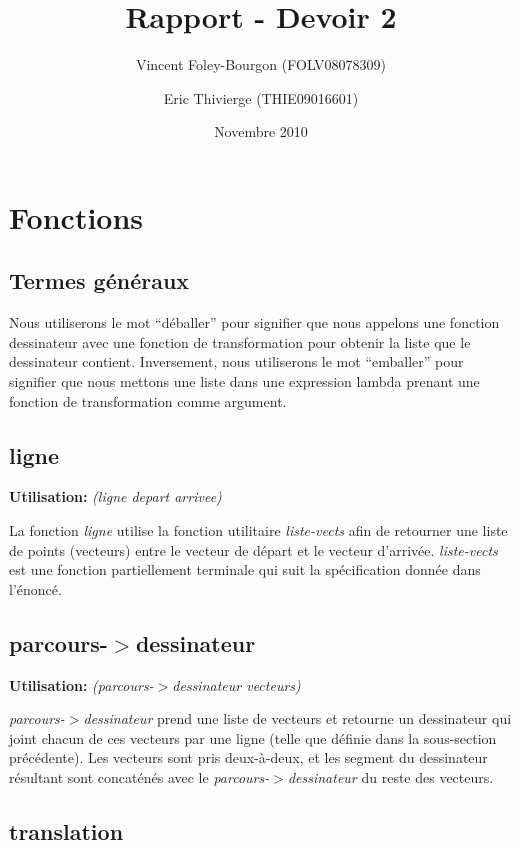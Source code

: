 \documentclass[10pt]{report}
\newcommand{\usage}[1]{\textbf{Utilisation: }\emph{#1}}
\begin{document}
\title{Rapport - Devoir 2}
\date{Novembre 2010}
\author{Vincent Foley-Bourgon (FOLV08078309) \and
  Eric Thivierge (THIE09016601)}

\maketitle

\section{Fonctions}

\subsection{Termes généraux}

Nous utiliserons le mot ``déballer'' pour signifier que nous appelons
une fonction dessinateur avec une fonction de transformation pour
obtenir la liste que le dessinateur contient.  Inversement, nous
utiliserons le mot ``emballer'' pour signifier que nous mettons une
liste dans une expression lambda prenant une fonction de
transformation comme argument.


\subsection{ligne}

\usage{(ligne depart arrivee)}

La fonction \emph{ligne} utilise la fonction utilitaire
\emph{liste-vects} afin de retourner une liste de points (vecteurs)
entre le vecteur de départ et le vecteur d'arrivée.
\emph{liste-vects} est une fonction partiellement terminale qui suit
la spécification donnée dans l'énoncé.

\subsection{parcours-$>$dessinateur}

\usage{(parcours-$>$dessinateur vecteurs)}

\emph{parcours-$>$dessinateur} prend une liste de vecteurs et retourne
un dessinateur qui joint chacun de ces vecteurs par une ligne (telle
que définie dans la sous-section précédente).  Les vecteurs sont pris
deux-à-deux, et les segment du dessinateur résultant sont concaténés
avec le \emph{parcours-$>$dessinateur} du reste des vecteurs.


\subsection{translation}
\end{document}
